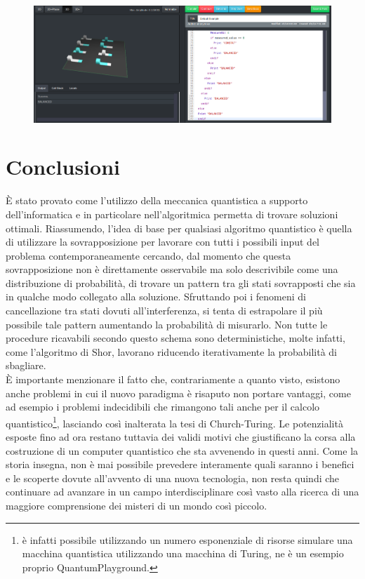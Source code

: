 \documentclass[12pt,a4paper,openright]{report}
\begin{document}
\begin{figure}[h]
    
            \includegraphics[width=.92\textwidth,height=\textheight,keepaspectratio]{nonLinearBalancedFunction}
        
\end{figure}

\chapter{Conclusioni}
È stato provato come l'utilizzo della meccanica quantistica a supporto dell'informatica e in particolare nell'algoritmica permetta di trovare soluzioni ottimali.
Riassumendo, l'idea di base per qualsiasi algoritmo quantistico è quella di utilizzare la sovrapposizione per lavorare con tutti i possibili input
del problema contemporaneamente cercando, dal momento che questa sovrapposizione non è direttamente osservabile ma solo descrivibile come una distribuzione di 
probabilità, di trovare un pattern tra gli stati sovrapposti che sia in qualche modo collegato alla soluzione. Sfruttando poi i fenomeni di cancellazione tra stati
dovuti all'interferenza, si tenta di estrapolare il più possibile tale pattern aumentando la probabilità di misurarlo. Non tutte le procedure ricavabili secondo
questo schema sono deterministiche, molte infatti, come l'algoritmo di Shor, lavorano riducendo iterativamente la probabilità di sbagliare.\\
È importante menzionare il fatto che, contrariamente a quanto visto, esistono anche problemi in cui il nuovo paradigma è risaputo non portare vantaggi, 
come ad esempio i problemi indecidibili che rimangono tali anche per il calcolo quantistico\footnote{è infatti possibile
utilizzando un numero esponenziale di risorse simulare una macchina quantistica utilizzando una macchina di Turing, ne è un esempio proprio QuantumPlayground.}, lasciando così inalterata la tesi di Church-Turing.
Le potenzialità esposte fino ad ora restano tuttavia dei validi motivi che giustificano la corsa alla costruzione di un computer quantistico
che sta avvenendo in questi anni. Come la storia insegna, non è mai possibile prevedere interamente quali saranno i benefici e le scoperte dovute all'avvento di una nuova tecnologia,
non resta quindi che continuare ad avanzare in un campo interdisciplinare così vasto alla ricerca di una maggiore comprensione dei misteri di un mondo così piccolo.
\end{document}
